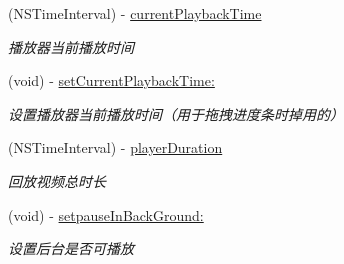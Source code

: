 \begin{DoxyCompactItemize}
(N\+S\+Time\+Interval) -\/ \hyperlink{interface_request_data_play_back_a5154fbd4bd4f342a6c260f65ea49501a}{current\+Playback\+Time}
\begin{DoxyCompactList}\small\item\em 播放器当前播放时间 \end{DoxyCompactList}\item 
\mbox{\label{interface_request_data_play_back_a3f340787f87e80a56e315b01f5637930}} 
(void) -\/ \hyperlink{interface_request_data_play_back_a3f340787f87e80a56e315b01f5637930}{set\+Current\+Playback\+Time\+:}
\begin{DoxyCompactList}\small\item\em 设置播放器当前播放时间（用于拖拽进度条时掉用的） \end{DoxyCompactList}\item 
\mbox{\label{interface_request_data_play_back_ad1228539b10ec8881a35221ee7d0b734}} 
(N\+S\+Time\+Interval) -\/ \hyperlink{interface_request_data_play_back_ad1228539b10ec8881a35221ee7d0b734}{player\+Duration}
\begin{DoxyCompactList}\small\item\em 回放视频总时长 \end{DoxyCompactList}\item 
\mbox{\label{interface_request_data_play_back_aecc0590a3973f70d67a17771e87cf6cd}} 
(void) -\/ \hyperlink{interface_request_data_play_back_aecc0590a3973f70d67a17771e87cf6cd}{setpause\+In\+Back\+Ground\+:}
\begin{DoxyCompactList}\small\item\em 设置后台是否可播放 \end{DoxyCompactList}\end{DoxyCompactItemize}
